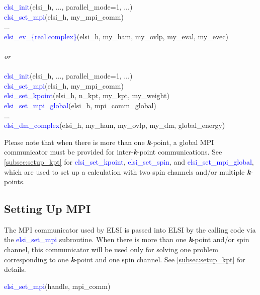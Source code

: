 \documentclass{report}
\begin{document}
\begin{algorithm}[H]
\textcolor{blue}{elsi\_init}(elsi\_h, ..., parallel\_mode=1, ...)\\
\textcolor{blue}{elsi\_set\_mpi}(elsi\_h, my\_mpi\_comm)\\
...\\
\textcolor{blue}{elsi\_ev\_\{real$\vert$complex\}}(elsi\_h, my\_ham, my\_ovlp, my\_eval, my\_evec)\\
~\\
\textit{or}\\
~\\
\textcolor{blue}{elsi\_init}(elsi\_h, ..., parallel\_mode=1, ...)\\
\textcolor{blue}{elsi\_set\_mpi}(elsi\_h, my\_mpi\_comm)\\
\textcolor{blue}{elsi\_set\_kpoint}(elsi\_h, n\_kpt, my\_kpt, my\_weight)\\
\textcolor{blue}{elsi\_set\_mpi\_global}(elsi\_h, mpi\_comm\_global)\\
...\\
\textcolor{blue}{elsi\_dm\_complex}(elsi\_h, my\_ham, my\_ovlp, my\_dm, global\_energy)\\
\end{algorithm}

\bigskip
Please note that when there is more than one \textbf{\textit{k}}-point, a global MPI communicator must be provided for inter-\textbf{\textit{k}}-point communications.  See \ref{subsec:setup_kpt} for \textcolor{blue}{elsi\_set\_kpoint}, \textcolor{blue}{elsi\_set\_spin}, and \textcolor{blue}{elsi\_set\_mpi\_global}, which are used to set up a calculation with two spin channels and/or multiple \textbf{\textit{k}}-points.

\subsection{Setting Up MPI}
\label{subsec:setup_mpi}
The MPI communicator used by ELSI is passed into ELSI by the calling code via the \textcolor{blue}{elsi\_set\_mpi} subroutine.  When there is more than one \textbf{\textit{k}}-point and/or spin channel, this communicator will be used only for solving one problem corresponding to one \textbf{\textit{k}}-point and one spin channel.  See \ref{subsec:setup_kpt} for details.\\

\begin{labeling}{\hspace{6cm}}
\item [\hspace{0.3cm} \textcolor{blue}{elsi\_set\_mpi}(handle, mpi\_comm)]
\end{labeling}
\end{document}
